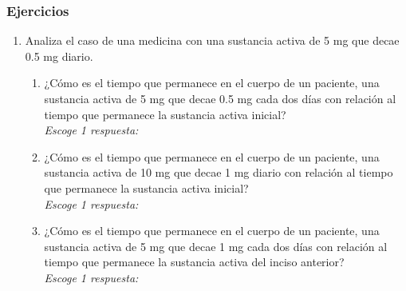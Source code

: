 \documentclass[11pt]{book}
\begin{document}
\subsubsection{Ejercicios}
\begin{enumerate}
  \item Analiza el caso de una medicina con una sustancia activa de 5 mg que decae 0.5 mg diario.
        \begin{enumerate}
          \item ¿Cómo es el tiempo que permanece en el cuerpo de un paciente, una sustancia activa
                de 5 mg que decae 0.5 mg cada dos días con relación al tiempo que permanece la sustancia activa inicial?\\
                \emph{Escoge 1 respuesta:}\\
          \item¿Cómo es el tiempo que permanece en el cuerpo de un paciente, una sustancia activa de 10 mg que decae
                1 mg diario con relación al tiempo que permanece la sustancia activa inicial?\\
                \emph{Escoge 1 respuesta:}\\
          \item ¿Cómo es el tiempo que permanece en el cuerpo de un paciente, una sustancia activa de 5 mg que decae 1 mg
                cada dos días con relación al tiempo que permanece la sustancia activa del inciso anterior?\\
                \emph{Escoge 1 respuesta:}\\
\end{enumerate}
\end{enumerate}
\end{document}
